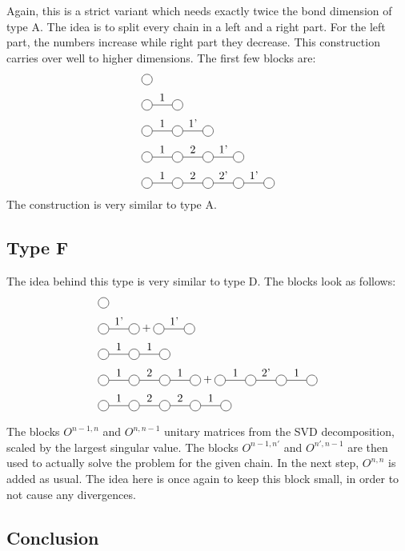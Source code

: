 Again, this is a strict variant which needs exactly twice the bond dimension of type A. The idea is to split every chain in a left and a right part. For the left part, the numbers increase while right part they decrease. This construction carries over well to higher dimensions. The first few blocks are:
\begin{equation}
    \begin{split}
        &\mpob{1}{ {,}  }{}{}{}{{,,}} \\
        &\mpob{2}{ {,"1",}  }{}{}{}{{,,}}\\
        &\mpob{3}{ {,"1","1'",}  }{}{}{}{{,,,}}\\
        &\mpob{4}{ {,"1","2","1'",}  }{}{}{}{{,,,,,}}\\
        &\mpob{5}{ {,"1","2","2'","1'",}  }{}{}{}{{,,,,,}}\\
    \end{split}
\end{equation}
The construction is very similar to type A.

\subsection{Type F}

The idea behind this type is very similar to type D. The blocks look as follows:
\begin{equation}
    \begin{split}
        &\mpob{1}{ {,}  }{}{}{}{{,,}} \\
        &\mpob{2}{ {,"1'",}  }{}{}{}{{,,}}+\mpob{2}{ {,"1'",}  }{}{}{}{{,,}}\\
        &\mpob{3}{ {,"1","1",}  }{}{}{}{{,,,}}\\
        &\mpob{4}{ {,"1","2","1",}  }{}{}{}{{,,,,,}}+\mpob{4}{ {,"1","2'","1",}  }{}{}{}{{,,,,,}}\\
        &\mpob{5}{ {,"1","2","2","1",}  }{}{}{}{{,,,,,}}\\
    \end{split}
\end{equation}

The  blocks $O^{n-1,n}$ and $O^{n,n-1}$ unitary matrices from the SVD decomposition, scaled by the largest singular value. The blocks $O^{n-1,n'}$ and $O^{n',n-1}$ are then used to actually solve the problem for the given chain. In the next step, $O^{n,n}$ is added as usual. The idea here is once again to keep this block small, in order to not cause any divergences.

\subsection{Conclusion}

